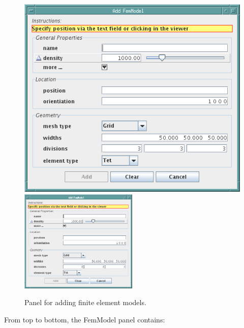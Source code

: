 \documentclass{article}
\begin{document}
\begin{figure}
\begin{center}
\iflatexml
\includegraphics[]{images/addFemModelPanel}
\else
\includegraphics[width=0.50\textwidth]{images/addFemModelPanel}
\fi
\end{center}
\caption{Panel for adding finite element models.}%
\label{addFemModelPanelFig}
\end{figure}

From top to bottom, the FemModel panel contains:
\end{document}
